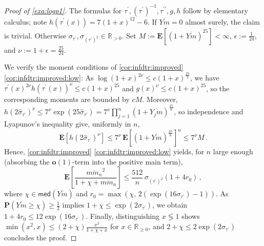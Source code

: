 \documentclass{article}
\newcommand*{\mo}[1]{\mathbf{#1}}
\newcommand{\R}{\mathbb{R}}
\newcommand{\Rp}{\R_{\geq0}}
\newcommand{\Rpp}{\R_{>0}}
\newcommand{\lab}{\left[} %
\newcommand{\rab}{\right]} %
\newcommand{\ab}[1]{\lab #1 \rab} %
\newcommand{\abOf}[1]{\!\ab{#1}} %
\newcommand{\lb}{\left(} %
\newcommand{\rb}{\right)} %
\newcommand{\br}[1]{\lb #1 \rb} %
\newcommand{\brOf}[1]{\!\br{#1}} %
\renewcommand{\Pr}{\mathbf{P}} %
\newcommand{\Prof}[1]{\Pr(#1)}
\newcommand{\E}{\mathbf{E}} %
\newcommand{\Eof}[1]{\E[#1]}
\newcommand{\EOf}[1]{\E\abOf{#1}}
\newcommand{\pr}{^\prime}
\newcommand{\prr}{^{\prime\prime}}
\newcommand{\eqcm}{\,,} %
\newcommand{\eqfs}{\,.}
\newcommand{\ol}[2]{\overline{#1#2}}
\newcommand{\dtran}{\tau\pr}
\newcommand{\ddtran}{\tau\prr}
\newcommand{\invdtran}{(\tau\pr)^{-1}}
\newcommand{\median}{\mathsf{med}}
\begin{document}
\begin{proof}[Proof of \cref{exa:logp1}]
    The formulas for $\dtran, \invdtran, \ddtran, g, h$ follow by elementary calculus; note $h(\dtran(x)) = 7(1+x)^{12}-6$.
    If $\ol Ym = 0$ almost surely, the claim is trivial. Otherwise $\sigma_{\dtran}, \sigma_{(\dtran)^2} \in \Rpp$.
    Set $M := \Eof{(1+\ol Ym)^{25}} < \infty$, $\epsilon := \frac1{24}$, and $\nu := 1+\epsilon = \frac{25}{24}$.
    
    We verify the moment conditions of \cref{cor:infdtr:improved} \ref{cor:infdtr:improved:low}:
    As $\log(1+x)^{2\nu} \leq c\br{1+x}^{\frac{25}2}$, we have
    $\dtran(x)^{2\nu} h(\dtran(x))^{\nu} \leq c\br{1+x}^{25}$ and $g(x)^\nu \leq c\br{1+x}^{25}$, so the corresponding moments are bounded by $cM$.
    Moreover, $h(2\hat\sigma_{\dtran})^\nu \leq 7^\nu \exp\brOf{25\hat\sigma_{\dtran}} = 7^\nu \prod_{j=1}^n (1+\ol{Y_j}m)^{\frac{25}n}$, so independence and Lyapunov's inequality give, uniformly in $n$,
    \begin{equation}
        \EOf{h(2\hat\sigma_{\dtran})^{\nu}}
        \leq
        7^{\nu}\, \EOf{(1+\ol Ym)^{\frac{25}{n}}}^{n}
        \leq
        7^{\nu} M
        \eqfs
    \end{equation}
    Hence, \cref{cor:infdtr:improved} \ref{cor:infdtr:improved:low} yields, for $n$ large enough (absorbing the $\mo o(1)$-term into the positive main term),
    \begin{equation}
        \EOf{\frac{\ol m{m_n}^2}{1+\chi+\ol m{m_n}}}
        \leq
        \frac{512}{n}\, \sigma_{(\dtran)^2} \br{1+4r_0}
        \eqcm
    \end{equation}
    where $\chi\in\median(\ol Ym)$ and $r_0 = \max\brOf{\chi,\, 2\br{\exp(16\sigma_{\dtran})-1}}$.
    As $\Prof{\ol Ym\geq\chi}\geq\frac12$ implies $1+\chi \leq \exp(2\sigma_{\dtran})$, we obtain $1+4r_0 \leq 12\exp(16\sigma_{\dtran})$.
    Finally, distinguishing $x\lessgtr1$ shows $\min(x^2,x) \leq (2+\chi)\frac{x^2}{1+\chi+x}$ for $x\in\Rp$, and $2+\chi \leq 2\exp(2\sigma_{\dtran})$ concludes the proof.
\end{proof}
%
%
%
\end{document}
